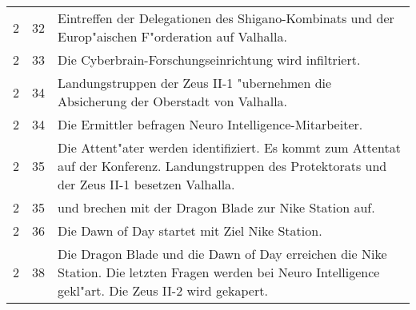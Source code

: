 \begin{boxedtext}
\begin{tabularx}{\textwidth}{r r X}
        2       &   32 & Eintreffen der Delegationen des Shigano-Kombinats und der Europ"aischen F"orderation auf Valhalla.\\
        2       &   33 & Die Cyberbrain-Forschungseinrichtung wird infiltriert.\\
        2       &   34 & Landungstruppen der Zeus II-1 "ubernehmen die Absicherung der Oberstadt von Valhalla.\\
        2       &   34 & Die Ermittler befragen Neuro Intelligence-Mitarbeiter.\\
        2       &   35 & Die Attent"ater werden identifiziert. Es kommt zum Attentat auf der Konferenz. Landungstruppen des 
                         Protektorats und der Zeus II-1 besetzen Valhalla. \\
        2       &   35 & \xl{} und \ml{} brechen mit der Dragon Blade zur Nike Station auf.\\
        2       &   36 & Die Dawn of Day startet mit Ziel Nike Station.\\
        2       &   38 & Die Dragon Blade und die Dawn of Day erreichen die Nike Station. Die letzten Fragen werden bei Neuro Intelligence 
                         gekl"art. Die Zeus II-2 wird gekapert.\\
    \end{tabularx}
\end{boxedtext}
\renewcommand{\arraystretch}{1}
\pagebreak

